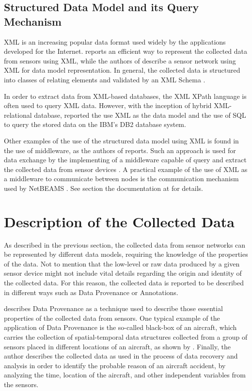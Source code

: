\subsection{Structured Data Model and its Query Mechanism}

XML is an increasing popular data format used widely by the applications developed
for the Internet. \cite{sn-xml-usage01} reports an efficient way to represent
the collected data from sensors using XML, while the authors of
\cite{sn-xml-usage02} describe a sensor network using XML for data model
representation. In general, the collected data is structured into classes of
relating elements and validated by an XML Schema \cite{xml-schema}.

In order to extract data from XML-based databases, the XML XPath language
\cite{xml-xpath} is often used to query XML data. However, with the inception
of hybrid XML-relational database, \cite{sn-xml-usage03} reported the use XML
as the data model and the use of SQL to query the stored data on the IBM's DB2
database system. 

Other examples of the use of the structured data model using XML is found in
the use of middleware, as the authors of \cite{sn-xml-query-engines} reports.
Such an approach is used for data exchange by the implementing of a middleware
capable of query and extract the collected data from sensor devices
\cite{sn-xml-middleware}. A practical example of the use of XML as a middleware
to communicate between nodes is the communication mechanism used by NetBEAMS
\cite{netbeams2009}. See section the documentation at
\cite{netbeams-dsp-architecture} for details.

\section{Description of the Collected Data}
\label{sec:sn-data-description}

As described in the previous section, the collected data from sensor networks
can be represented by different data models, requiring the knowledge of the
properties of the data. Not to mention that the low-level or raw data produced
by a given sensor device might not include vital details regarding the
origin and identity of the collected data. For this reason, the collected data
is reported to be described in different ways such as Data Provenance or
Annotations.

\cite{sn-provenance} describes Data Provenance as a technique used to describe
those essential properties of the collected data from sensors. One typical
example of the application of Data Provenance is the so-called black-box of an
aircraft, which carries the collection of spatial-temporal data structures
collected from a group of sensors placed in different locations of an
aircraft, as shown by \cite{sn-exemple-blackbox}. Finally, the author describes 
the collected data as used in the process of data recovery and analysis in order to
identify the probable reason of an aircraft accident, by analyzing the time, 
location of the aircraft, and other independent variables from the sensors.

